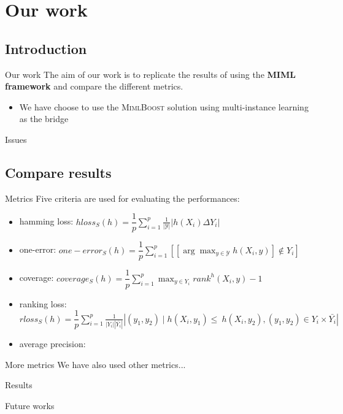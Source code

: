 \section{Our work}

\subsection*{Introduction}
\begin{frame}{Our work}
	The aim of our work is to replicate the results of \cite{miml1} using the \textbf{MIML framework} and compare the different metrics.\\
	\vspace{12px}
	\begin{itemize}
		\item We have choose to use the \textsc{MimlBoost} solution using multi-instance learning as the bridge
	\end{itemize}
	
	
\end{frame}
\begin{frame}{Issues}
	
	
\end{frame}

\subsection{Compare results}
\begin{frame}{Metrics}
	Five criteria are used for evaluating the performances:
	\begin{itemize}
		\item hamming loss: $hloss_S(h) = \dfrac{1}{p}\sum_{i=1}^{p}\frac{1}{|\mathcal{Y}|}|h(X_i)\Delta Y_i|$ 
		\item one-error: $one-error_S(h)=\dfrac{1}{p}\sum_{i=1}^{p}[[\arg \max_{y \in \mathcal{Y}} h(X_i,y)]\notin Y_i]$
		\item coverage: $coverage_S(h)=\dfrac{1}{p}\sum_{i=1}^{p}\max_{y \in Y_i}rank^h(X_i,y)-1$
		\item ranking loss: $rloss_S(h) = \dfrac{1}{p}\sum_{i=1}^{p}\frac{1}{|Y_i||\bar{Y_i}|}|{(y_1,y_2) \mid}h(X_i,y_1)\leq \ h(X_i,y_2), (y_1,y_2) \in Y_i \times \bar{Y_i} |$
		\item average precision: 
	\end{itemize}
\end{frame}

\begin{frame}{More metrics}
	We have also used other metrics...
	\begin{flushright}
		\cite{metrics}
	\end{flushright}
\end{frame}

\begin{frame}{Results}
	
\end{frame}

\begin{frame}{Future works}
	
\end{frame}